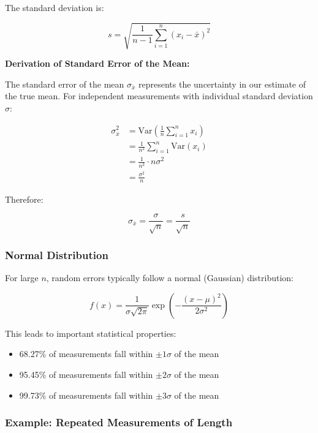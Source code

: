 \documentclass[twoside]{book}
\begin{document}
The standard deviation is:

\begin{equation}
s = \sqrt{\frac{1}{n-1}\sum_{i=1}^{n}(x_i - \bar{x})^2}
\end{equation}

\textbf{Derivation of Standard Error of the Mean:}

The standard error of the mean $\sigma_{\bar{x}}$ represents the uncertainty in our estimate of the true mean. For independent measurements with individual standard deviation $\sigma$:

\begin{align}
\sigma_{\bar{x}}^2 &= \text{Var}\left(\frac{1}{n}\sum_{i=1}^{n} x_i\right) \\
&= \frac{1}{n^2}\sum_{i=1}^{n}\text{Var}(x_i) \\
&= \frac{1}{n^2} \cdot n \sigma^2 \\
&= \frac{\sigma^2}{n}
\end{align}

Therefore:

\begin{equation}
\sigma_{\bar{x}} = \frac{\sigma}{\sqrt{n}} = \frac{s}{\sqrt{n}}
\end{equation}

\subsubsection{Normal Distribution}

For large $n$, random errors typically follow a normal (Gaussian) distribution:

\begin{equation}
f(x) = \frac{1}{\sigma\sqrt{2\pi}}\exp\left(-\frac{(x-\mu)^2}{2\sigma^2}\right)
\end{equation}

This leads to important statistical properties:
\begin{itemize}
\item 68.27\% of measurements fall within $\pm 1\sigma$ of the mean
\item 95.45\% of measurements fall within $\pm 2\sigma$ of the mean
\item 99.73\% of measurements fall within $\pm 3\sigma$ of the mean
\end{itemize}

\subsubsection{Example: Repeated Measurements of Length}
\end{document}
